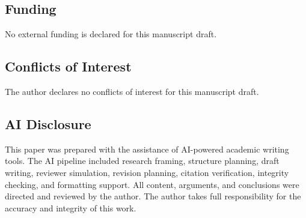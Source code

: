 \documentclass[11pt]{article}
\begin{document}
\subsection{Funding}
No external funding is declared for this manuscript draft.
\subsection{Conflicts of Interest}
The author declares no conflicts of interest for this manuscript draft.
\subsection{AI Disclosure}
This paper was prepared with the assistance of AI-powered academic writing tools. The AI pipeline included research framing, structure planning, draft writing, reviewer simulation, revision planning, citation verification, integrity checking, and formatting support. All content, arguments, and conclusions were directed and reviewed by the author. The author takes full responsibility for the accuracy and integrity of this work.
\end{document}
